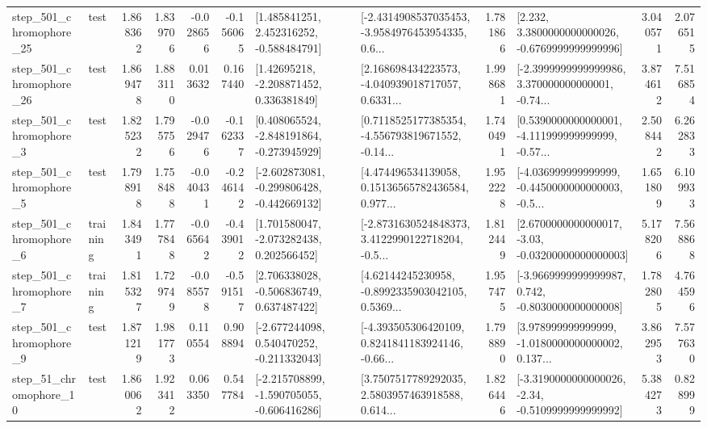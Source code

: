 \begin{tabular}{llrrrrllrlrr}
  step\_501\_chromophore\_25 &      test &      1.868362 &    1.839706 &     -0.028656 & -0.156065 &    [1.485841251, 2.452316252, -0.588484791] &  [-2.4314908537035453, -3.9584976453954335, 0.6... &       1.781866 &   [2.232, 3.3800000000000026, -0.6769999999999996] &            3.040571 &          2.076515 \\
  step\_501\_chromophore\_26 &      test &      1.869478 &    1.883110 &      0.013632 &  0.167440 &     [1.42695218, -2.208871452, 0.336381849] &  [2.168698434223573, -4.040939018717057, 0.6331... &       1.998681 &  [-2.3999999999999986, 3.370000000000001, -0.74... &            3.874612 &          7.516854 \\
   step\_501\_chromophore\_3 &      test &      1.825232 &    1.795756 &     -0.029476 & -0.162337 &   [0.408065524, -2.848191864, -0.273945929] &  [0.7118525177385354, -4.556793819671552, -0.14... &       1.740491 &  [0.5390000000000001, -4.111999999999999, -0.57... &            2.508442 &          6.262833 \\
   step\_501\_chromophore\_5 &      test &      1.798918 &    1.758488 &     -0.040431 & -0.246142 &  [-2.602873081, -0.299806428, -0.442669132] &  [4.474496534139058, 0.15136565782436584, 0.977... &       1.952228 &  [-4.036999999999999, -0.4450000000000003, -0.5... &            1.651809 &          6.109933 \\
   step\_501\_chromophore\_6 &  training &      1.843491 &    1.777848 &     -0.065642 & -0.439012 &    [1.701580047, -2.073282438, 0.202566452] &  [-2.8731630524848373, 3.4122990122718204, -0.5... &       1.812449 &  [2.6700000000000017, -3.03, -0.03200000000000003] &            5.178206 &          7.568868 \\
   step\_501\_chromophore\_7 &  training &      1.815327 &    1.729749 &     -0.085578 & -0.591517 &    [2.706338028, -0.506836749, 0.637487422] &  [4.62144245230958, -0.8992335903042105, 0.5369... &       1.957475 &  [-3.9669999999999987, 0.742, -0.8030000000000008] &            1.782805 &          4.764596 \\
   step\_501\_chromophore\_9 &      test &      1.871219 &    1.981773 &      0.110554 &  0.908894 &   [-2.677244098, 0.540470252, -0.211332043] &  [-4.393505306420109, 0.8241841183924146, -0.66... &       1.798890 &  [3.978999999999999, -1.0180000000000002, 0.137... &            3.862953 &          7.577630 \\
   step\_51\_chromophore\_10 &      test &      1.860062 &    1.923412 &      0.063350 &  0.547784 &  [-2.215708899, -1.590705055, -0.606416286] &  [3.7507517789292035, 2.5803957463918588, 0.614... &       1.826446 &  [-3.3190000000000026, -2.34, -0.5109999999999992] &            5.384273 &          0.828999 \\

\end{tabular}
